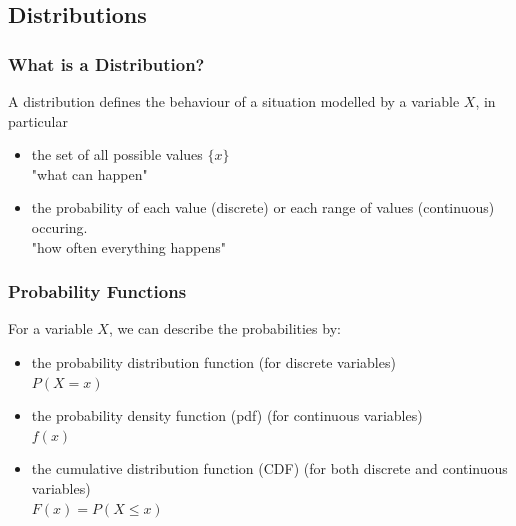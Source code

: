 \documentclass[t,xcolor=pdftex,dvipsnames,table]{beamer}\usepackage[]{graphicx}\usepackage[]{color}
\begin{document}
\subsection[Distributions]{Distributions}
\begin{frame}\frametitle{What is a Distribution?}
\begin{definition}[Distribution]
A \alert{distribution} defines the behaviour of a situation modelled by a variable $X$, in particular
\begin{itemize}
\item the set of all possible values $\{ x \}$ \\
"what can happen"

\item the probability of each value (discrete) or each range of values (continuous) occuring.\\
"how often everything happens"
\end{itemize}

\end{definition}
\end{frame}

\begin{frame}[fragile, label=CDF]\frametitle{Probability Functions}

\begin{definition}

For a variable $X$, we can describe the probabilities by:
\begin{itemize}
\item the \alert{probability distribution function} (for discrete variables) \\ 
$P(X=x)$

\item  the \alert{probability density function (pdf)} (for continuous variables) \\  $f(x)$ \\
\item  the \alert{cumulative distribution function (CDF)} (for both discrete and continuous variables)  \\
$F(x) = P(X \leq x)$

\end{itemize}
\end{definition}
\end{frame}
\end{document}
